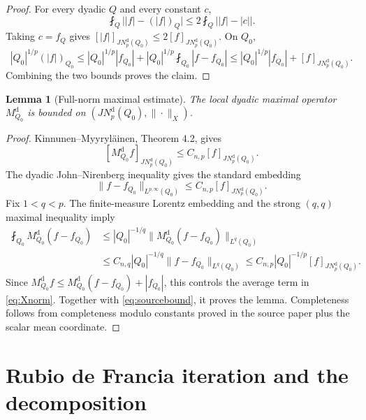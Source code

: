 \documentclass[11pt]{article}
\newtheorem{lemma}[theorem]{Lemma}
\newcommand{\avg}{\mathop{\fint}}
\newcommand{\M}{M^{\mathrm d}_{Q_0}}
\newcommand{\JN}{JN^{\mathrm d}_p(Q_0)}
\begin{document}
\begin{proof}
For every dyadic $Q$ and every constant $c$,
\[
 \avg_Q\bigl||f|-(|f|)_Q\bigr|
 \leq2\avg_Q\bigl||f|-|c|\bigr|.
\]
Taking $c=f_Q$ gives
$[|f|]_{\JN}\leq2[f]_{\JN}$.  On $Q_0$,
\[
 |Q_0|^{1/p}(|f|)_{Q_0}
 \leq |Q_0|^{1/p}|f_{Q_0}|
      +|Q_0|^{1/p}\avg_{Q_0}|f-f_{Q_0}|
 \leq |Q_0|^{1/p}|f_{Q_0}|+[f]_{\JN}.
\]
Combining the two bounds proves the claim.
\end{proof}

\begin{lemma}[Full-norm maximal estimate]\label{lem:maximal}
The local dyadic maximal operator $\M$ is bounded on $(\JN,\|\cdot\|_X)$.
\end{lemma}

\begin{proof}
Kinnunen--Myyryl\"ainen, Theorem 4.2, gives
\begin{equation}\label{eq:sourcebound}
 [\M f]_{\JN}\leq C_{n,p}[f]_{\JN}.
\end{equation}
The dyadic John--Nirenberg inequality gives the standard embedding
\begin{equation}\label{eq:weakembed}
 \|f-f_{Q_0}\|_{L^{p,\infty}(Q_0)}\leq C_{n,p}[f]_{\JN}.
\end{equation}
Fix $1<q<p$.  The finite-measure Lorentz embedding and the strong $(q,q)$
maximal inequality imply
\begin{align*}
 \avg_{Q_0}\M(f-f_{Q_0})
 &\leq |Q_0|^{-1/q}\|\M(f-f_{Q_0})\|_{L^q(Q_0)}\\
 &\leq C_{n,q}|Q_0|^{-1/q}\|f-f_{Q_0}\|_{L^q(Q_0)}
 \leq C_{n,p}|Q_0|^{-1/p}[f]_{\JN}.
\end{align*}
Since $\M f\leq\M(f-f_{Q_0})+|f_{Q_0}|$, this controls the average term in
\eqref{eq:Xnorm}.  Together with \eqref{eq:sourcebound}, it proves the
lemma.  Completeness follows from completeness modulo constants proved in the
source paper plus the scalar mean coordinate.
\end{proof}

\section{Rubio de Francia iteration and the decomposition}
\end{document}
